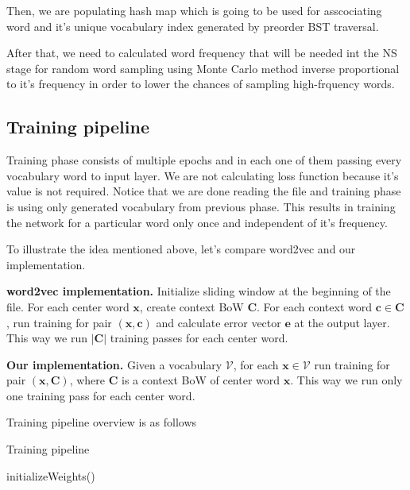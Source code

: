 \documentclass{article}
\newcommand{\SetAlgoStyle}{
	\SetAlgoNoLine
	\SetAlgoNoEnd
	\DontPrintSemicolon
}
\begin{document}
\medbreak

Then, we are populating hash map which is going to be used for asscociating
word and it's unique vocabulary index generated by preorder BST traversal.

\medbreak

After that, we need to calculated word frequency that will be needed
int the NS stage for random word sampling using Monte Carlo method inverse
proportional to it's frequency in order to lower the chances of sampling
high-frquency words.

\subsection{Training pipeline}

Training phase consists of multiple epochs and in each one of them passing
every vocabulary word to input layer. We are not calculating loss function
because it's value is not required. Notice that we are done reading the file
and training phase is using only generated vocabulary from previous phase.
This results in training the network for a particular word only once and
independent of it's frequency.

\medbreak

To illustrate the idea mentioned above, let's compare word2vec and our implementation.

\textbf{word2vec implementation.}
Initialize sliding window at the beginning of the file. For each center word $\boldsymbol{x}$, create context BoW $\boldsymbol{C}$. For each context word $\boldsymbol{c} \in \boldsymbol{C}$, run training for pair $(\boldsymbol{x}, \boldsymbol{c})$ and calculate error vector $\boldsymbol{e}$ at the output layer. This way we run $|\boldsymbol{C}|$ training passes for each center word.

\textbf{Our implementation.}
Given a vocabulary $\mathcal{V}$, for each $\boldsymbol{x} \in \mathcal{V}$ run training for pair $(\boldsymbol{x}, \boldsymbol{C})$, where $\boldsymbol{C}$ is a context BoW of center word $\boldsymbol{x}$. This way we run only one training pass for each center word.

Training pipeline overview is as follows

\begin{algorithm}[H]
	\caption{Training pipeline}
	\SetAlgoStyle
	initializeWeights()\;
\end{algorithm}
\end{document}
